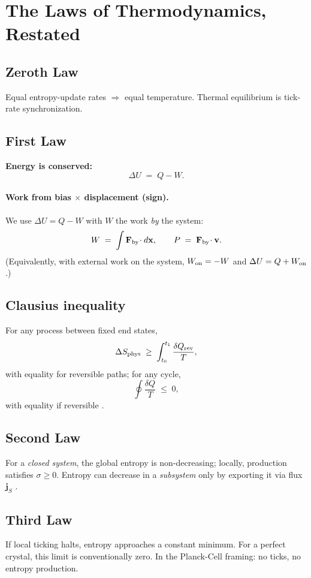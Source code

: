 \section*{The Laws of Thermodynamics, Restated}

\subsection*{Zeroth Law}
Equal entropy-update rates \(\Rightarrow\) equal temperature. Thermal equilibrium is tick-rate synchronization.

\subsection*{First Law}
\textbf{Energy is conserved:}
\[
\Delta U \;=\; Q - W.
\]
\paragraph{Work from bias \(\times\) displacement (sign).}
We use \( \Delta U = Q - W\) with \(W\) the work \emph{by} the system:
\[
W \;=\; \int \mathbf F_{\rm by}\!\cdot d\mathbf x,\qquad
P \;=\; \mathbf F_{\rm by}\!\cdot \mathbf v.
\]
(Equivalently, with external work on the system, \(W_{\rm on}=-W\) and \(\Delta U=Q+W_{\rm on}\).)

\subsection*{Clausius inequality}
For any process between fixed end states,
\[
\Delta S_{\mathrm{phys}} \;\ge\; \int_{t_0}^{t_1} \frac{\delta Q_{\rm rev}}{T},
\]
with equality for reversible paths; for any cycle,
\[
\oint \frac{\delta Q}{T} \;\le\; 0,
\]
with equality if reversible \cite{clausius1879mechanical,callen1985thermodynamics}.

\subsection*{Second Law}
For a \emph{closed system}, the global entropy is non-decreasing; locally, production satisfies \(\sigma\ge 0\).
Entropy can decrease in a \emph{subsystem} only by exporting it via flux \(\mathbf j_S\) \cite{boltzmann1872,shannon1948mathematical,zeh2007arrow}.

\subsection*{Third Law}
If local ticking halts, entropy approaches a constant minimum. For a perfect crystal, this limit is conventionally zero. In the Planck-Cell framing: no ticks, no entropy production.

